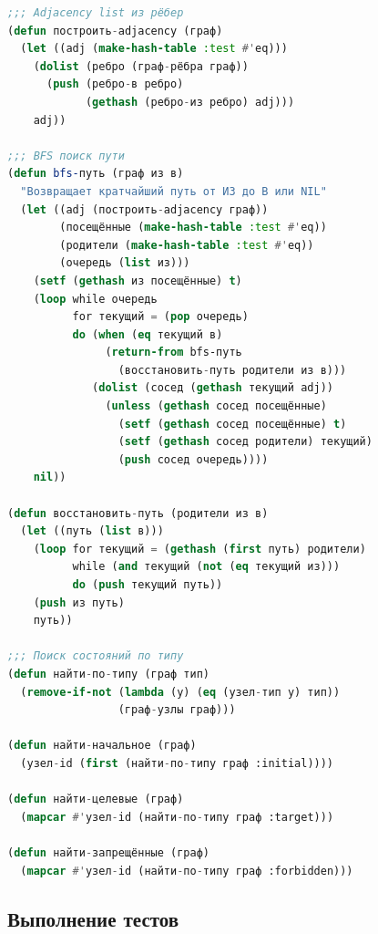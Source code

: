 \documentclass[12pt, a4paper, twoside]{article}
\begin{document}
\begin{lstlisting}[language=CommonLisp,caption={BFS и анализ достижимости}]
;;; Adjacency list из рёбер
(defun построить-adjacency (граф)
  (let ((adj (make-hash-table :test #'eq)))
    (dolist (ребро (граф-рёбра граф))
      (push (ребро-в ребро)
            (gethash (ребро-из ребро) adj)))
    adj))

;;; BFS поиск пути
(defun bfs-путь (граф из в)
  "Возвращает кратчайший путь от ИЗ до В или NIL"
  (let ((adj (построить-adjacency граф))
        (посещённые (make-hash-table :test #'eq))
        (родители (make-hash-table :test #'eq))
        (очередь (list из)))
    (setf (gethash из посещённые) t)
    (loop while очередь
          for текущий = (pop очередь)
          do (when (eq текущий в)
               (return-from bfs-путь
                 (восстановить-путь родители из в)))
             (dolist (сосед (gethash текущий adj))
               (unless (gethash сосед посещённые)
                 (setf (gethash сосед посещённые) t)
                 (setf (gethash сосед родители) текущий)
                 (push сосед очередь))))
    nil))

(defun восстановить-путь (родители из в)
  (let ((путь (list в)))
    (loop for текущий = (gethash (first путь) родители)
          while (and текущий (not (eq текущий из)))
          do (push текущий путь))
    (push из путь)
    путь))

;;; Поиск состояний по типу
(defun найти-по-типу (граф тип)
  (remove-if-not (lambda (у) (eq (узел-тип у) тип))
                 (граф-узлы граф)))

(defun найти-начальное (граф)
  (узел-id (first (найти-по-типу граф :initial))))

(defun найти-целевые (граф)
  (mapcar #'узел-id (найти-по-типу граф :target)))

(defun найти-запрещённые (граф)
  (mapcar #'узел-id (найти-по-типу граф :forbidden)))
\end{lstlisting}

\subsection{Выполнение тестов}
\end{document}
